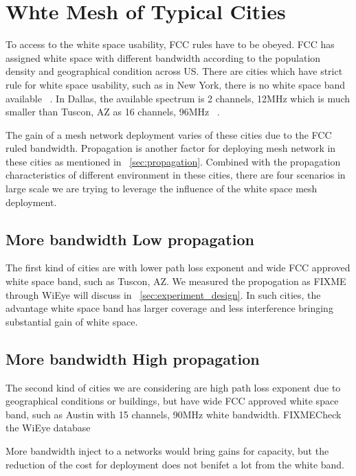 \section{Whte Mesh of Typical Cities}
\label{sec:cities}


To access to the white space usability, FCC rules have to be obeyed. 
FCC has assigned white space with different bandwidth according to the population density and geographical condition across US.
There are cities which have strict rule for white space usability, such as in New York, there is no white space band available ~\cite{googlespectrumdatabase}. 
In Dallas, the available spectrum is 2 channels, 12MHz which is much smaller than Tuscon, AZ as 16 channels, 96MHz ~\cite{googlespectrumdatabase}. 

The gain of a mesh network deployment varies of these cities due to the FCC ruled bandwidth.
Propagation is another factor for deploying mesh network in these cities as mentioned in ~\ref{sec:propagation}.
Combined with the propagation characteristics of different environment in these cities, there are four scenarios in large scale we are trying to leverage the influence of the white space mesh deployment.

\subsection{More bandwidth Low propagation}
The first kind of cities are with lower path loss exponent and wide FCC approved white space band, such as Tuscon, AZ. We measured the propogation as FIXME through WiEye will discuss in ~\ref{sec:experiment_design}.
In such cities, the advantage white space band has larger coverage and less interference bringing substantial gain of white space.


\subsection{More bandwidth High propagation}
The second kind of cities we are considering are high path loss exponent due to geographical conditions or buildings, but have wide FCC approved white space band, such as Austin with 15 channels, 90MHz white bandwidth. FIXME{Check the WiEye database}

More bandwidth inject to a networks would bring gains for capacity, but the reduction of the cost for deployment does not benifet a lot from the white band.


